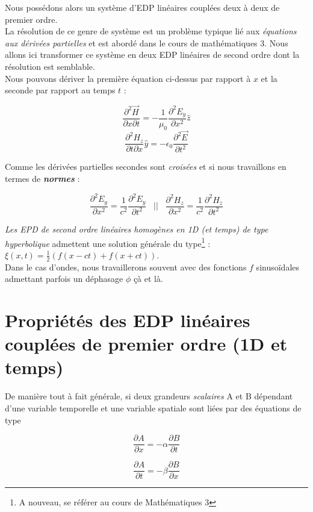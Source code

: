 \begin{itemize}
Nous possédons alors un système d'EDP linéaires couplées deux à deux de premier ordre. \\
La résolution de ce genre de système est un problème typique lié aux \textit{équations aux dérivées partielles} et est abordé dans le cours
de mathématiques 3. Nous allons ici transformer ce système en deux EDP linéaires de second ordre dont la résolution est semblable. \\
Nous pouvons dériver la première équation ci-dessus par rapport à $x$ et la seconde par rapport au temps $t$ : 

\[  \frac{\partial^{2} \vec{H}}{\partial x \partial t} = -\frac{1}{\mu_{0}} \frac{\partial^{2} E_{y}}{\partial x^{2}} \hat{z}\]
\[  \frac{\partial^{2} H_{z}}{\partial t \partial x} \hat{y} = - \epsilon_{0} \frac{\partial^{2} \vec{E}}{\partial t^{2}} \]

Comme les dérivées partielles secondes sont \textit{croisées} et si nous travaillons en termes de \textbf{\textit{normes}} :

\[\frac{\partial^{2} E_{y}}{\partial x^{2}} = \frac{1}{c^{2}}  \frac{\partial^{2} E_{y}}{\partial t^{2}} \hspace{10pt} \mbox{||} \hspace{10pt} \frac{\partial^{2} H_{z}}{\partial x^{2}} = \frac{1}{c^{2}}  \frac{\partial^{2} H_{z}}{\partial t^{2}}\]
\end{itemize}

\textit{Les EPD de second ordre linéaires homogènes en 1D (et temps) de type hyperbolique} admettent une solution générale du type\footnote{A nouveau, se référer au cours de Mathématiques 3}  : 
$ \xi(x,t) = \frac{1}{2}(f(x-ct)+f(x+ct)) $. \\ 
Dans le cas d'ondes, nous travaillerons souvent avec des fonctions $f$ sinusoïdales admettant parfois un déphasage $\phi$ çà et là. 
 

\section{Propriétés des EDP linéaires couplées de premier ordre (1D et temps)}

De manière tout à fait générale, si deux grandeurs \textit{scalaires} A et B dépendant d'une variable temporelle et une variable spatiale sont 
liées par des équations de type 

\[\frac{\partial A}{\partial x} = -\alpha \frac{\partial B}{\partial t}\]

\[\frac{\partial A}{\partial t} = -\beta \frac{\partial B}{\partial x}\]

